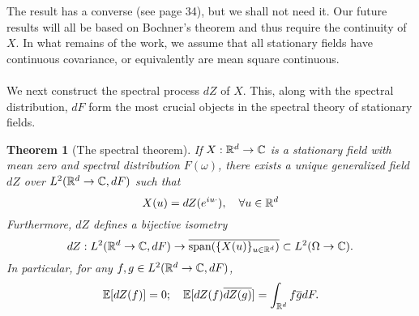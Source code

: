 \documentclass[12pt]{article}
\newtheorem{theorem}{Theorem}
\begin{document}
The result has a converse (see \cite{lindgren2012stationary} page 34), but we shall not need it. Our future results will all be based on Bochner's theorem and thus require the continuity of $X$. In what remains of the work, we assume that all stationary fields have continuous covariance, or equivalently are mean square continuous.\\
\\
We next construct the spectral process $dZ$ of $X$. This, along with the spectral distribution, $dF$ form the most crucial objects in the spectral theory of stationary fields.
\begin{theorem}[The spectral theorem]\label{spectral theorem}
    If $X:{\mathbb R}^d\to\mathbb{C}$ is a stationary field with mean zero and spectral distribution $F(\omega)$, there exists a unique generalized field $dZ$ over $L^2({\mathbb R}^d\to\mathbb{C},dF)$ such that
    \begin{equation}\label{spectral representation}
        X(u)=dZ(e^{iu\cdot}),\quad\forall u\in{\mathbb R}^d
    \end{equation}
    Furthermore, $dZ$ defines a bijective isometry
    \begin{equation*}
        dZ:L^2({\mathbb R}^d\to\mathbb{C},dF)\to\overline{\text{span}(\{X(u)\}_{u\in{\mathbb R}^d})}\subset L^2(\Omega\to\mathbb{C}).
    \end{equation*}
    In particular, for any $f,g\in L^2({\mathbb R}^d\to\mathbb{C},dF)$,
    \begin{equation}\label{dZ properties}
        \mathbb{E}[dZ(f)]=0;\quad \mathbb{E}[dZ(f)\overline{dZ(g)}]=\int_{{\mathbb R}^d} f\overline{g}dF.
    \end{equation}
\end{theorem}
\end{document}
